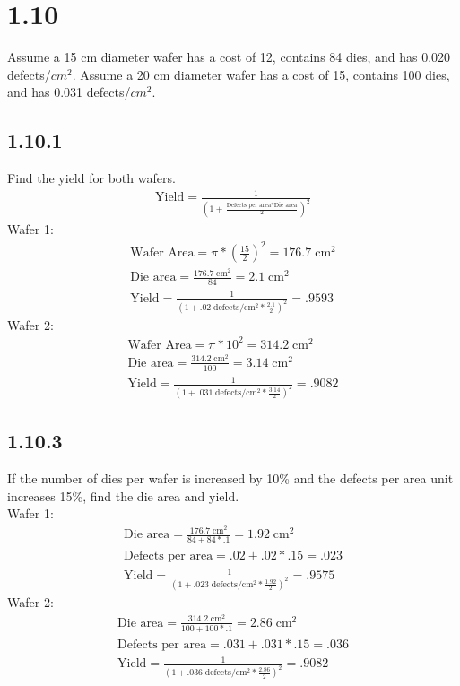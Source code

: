 \documentclass[12pt]{article}
\begin{document}
\section*{1.10}
Assume a 15 cm diameter wafer has a cost of 12, contains 84 dies, and has
0.020 defects/$cm^2$.  Assume a 20 cm diameter wafer has a cost of 15, contains 100
dies, and has 0.031 defects/$cm^2$.

\subsection*{1.10.1}
Find the yield for both wafers.
\begin{align*}
	\text{Yield} = \frac{1}{(1+\frac{\text{Defects per area}*\text{Die area}}{2})^2}
\end{align*}
Wafer 1:
\begin{gather*}
	\text{Wafer Area} = \pi*(\frac{15}{2})^2 = 176.7\;\text{cm}^2\\
	\text{Die area} = \frac{176.7\;\text{cm}^2}{84} = 2.1\;\text{cm}^2\\
	\text{Yield} = \frac{1}{(1+.02\;\text{defects/}\text{cm}^2*\frac{2.1}{2})^2} = .9593
\end{gather*}
Wafer 2:
\begin{gather*}
	\text{Wafer Area} = \pi*10^2 = 314.2\;\text{cm}^2\\
	\text{Die area} = \frac{314.2\;\text{cm}^2}{100} = 3.14\;\text{cm}^2\\
	\text{Yield} = \frac{1}{(1+.031\;\text{defects/}\text{cm}^2*\frac{3.14}{2})^2} = .9082
\end{gather*}

\subsection*{1.10.3}
If the number of dies per wafer is increased by 10\% and the
defects per area unit increases 15\%, find the die area and yield.\\
Wafer 1:
\begin{gather*}
	\text{Die area} = \frac{176.7\;\text{cm}^2}{84+84*.1} = 1.92\;\text{cm}^2\\
	\text{Defects per area} = .02+.02*.15 = .023\\
	\text{Yield} = \frac{1}{(1+.023\;\text{defects/}\text{cm}^2*\frac{1.92}{2})^2} = .9575
\end{gather*}
Wafer 2:
\begin{gather*}
	\text{Die area} = \frac{314.2\;\text{cm}^2}{100+100*.1} = 2.86\;\text{cm}^2\\
	\text{Defects per area} = .031+.031*.15 = .036\\
	\text{Yield} = \frac{1}{(1+.036\;\text{defects/}\text{cm}^2*\frac{2.86}{2})^2} = .9082
\end{gather*}
\end{document}
